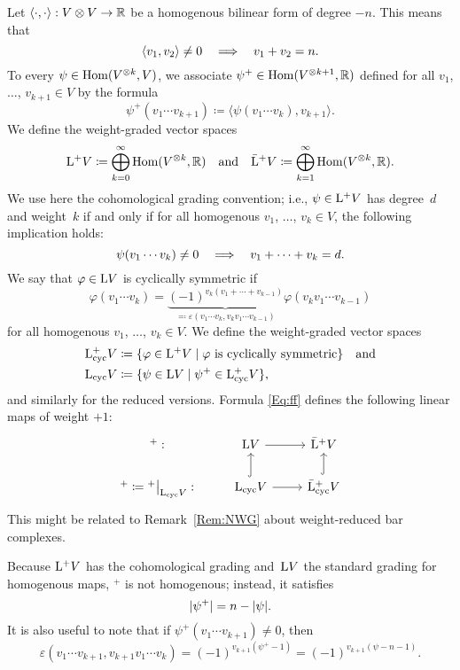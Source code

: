 \documentclass[\MainFolder/Text.tex]{subfiles}
\begin{document}
Let $\langle\cdot,\cdot\rangle: V \otimes V \rightarrow \mathbb{R}$ be a homogenous bilinear form of degree $-n$. This means that
\[ \langle v_1, v_2 \rangle \neq 0\quad\Longrightarrow\quad v_1 + v_2 = n. \]
To every $\psi\in \mathrm{Hom}(V^{\otimes k},V)$, we associate $\psi^+\in \mathrm{Hom}(V^{\otimes k + 1},\mathbb{R})$ defined for all $v_1$, $\dotsc$, $v_{k + 1} \in V$ by the formula
\begin{equation}\label{Eq:ff}
\psi^+(v_1\dotsb v_{k+1}) \coloneqq \langle \psi(v_1 \dotsb v_{k}),v_{k+1}\rangle.
\end{equation}
We define the weight-graded vector spaces
\begin{equation}\label{Eq:DSpPlusDef}
\mathrm{L}^+ V \coloneqq \bigoplus_{k=0}^\infty \mathrm{Hom}(V^{\otimes k},\mathbb{R})\quad\text{and}\quad\bar{\mathrm{L}}^+ V \coloneqq \bigoplus_{k=1}^\infty \mathrm{Hom}(V^{\otimes k},\mathbb{R}).
\end{equation}
We use here the cohomological grading convention; i.e., $\psi\in \mathrm{L}^+ V$ has degree~$d$ and weight~$k$ if and only if for all homogenous $v_1$, $\dotsc$, $v_k\in V$, the following implication holds:
\[ \psi(v_1 \dotsb v_k) \neq 0 \quad\Longrightarrow \quad v_1 + \dotsb + v_k = d. \] 
We say that $\varphi\in \mathrm{L} V$ is cyclically symmetric if 
\[ \varphi(v_1 \dotsb v_{k}) = \underbrace{(-1)^{v_{k}(v_1 + \dotsb + v_{k-1})}}_{\eqqcolon\varepsilon(v_1\dotsb v_{k},v_{k} v_1 \dotsb v_{k-1})} \varphi(v_{k} v_1 \dotsb v_{k-1}) \]
for all homogenous $v_1$, $\dotsc$, $v_{k}\in V$. We define the weight-graded vector spaces
\begin{align*}
\mathrm{L}^+_{\mathrm{cyc}} V &\coloneqq \{\varphi\in \mathrm{L}^+ V \mid \varphi\text{ is cyclically symmetric}\}\quad\text{and} \\
\mathrm{L}_{\mathrm{cyc}} V &\coloneqq \{\psi \in \mathrm{L} V \mid \psi^+ \in \mathrm{L}^+_{\mathrm{cyc}} V \},
\end{align*}
and similarly for the reduced versions. Formula \eqref{Eq:ff} defines the following linear maps of weight $+1$:
\begin{equation}\label{Eq:CycDiag}
\begin{tikzcd}
 {}^+: & \DSp V \arrow{r} & \DSpPlusRed V \\
 {}^+\coloneqq \Restr{{}^+}{\DSpCyc V}: & \DSpCyc V \arrow{r}\arrow[hook]{u} & \DSpPlusCycRed V\arrow[hook]{u}
\end{tikzcd}
\end{equation}
This might be related to Remark~\ref{Rem:NWG} about weight-reduced bar complexes.

Because $\mathrm{L}^+ V$ has the cohomological grading and~$\mathrm{L} V$ the standard grading for homogenous maps, ${}^+$ is not homogenous; instead, it satisfies 
\[|\psi^+| = n - |\psi|. \]
It is also useful to note that if $\psi^+(v_1\dotsb v_{k+1})\neq 0$, then
\[ \varepsilon(v_1\dotsb v_{k+1},v_{k+1} v_1 \dotsb v_k) = (-1)^{v_{k+1}(\psi^+ - 1)} = (-1)^{v_{k+1}(\psi - n - 1)}. \]
\end{document}
